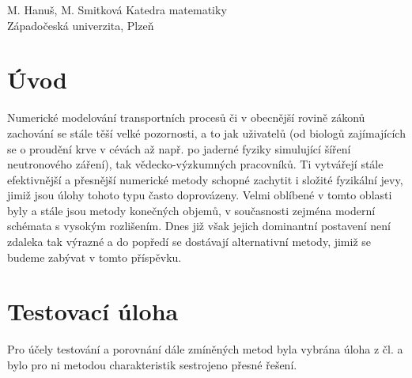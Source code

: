 \documentclass{sna}
\begin{document}
     {M. Hanuš, M. Smitková}
     {Katedra matematiky \\ Západočeská univerzita, Plzeň}

\section{Úvod}

Numerické modelování transportních procesů či v obecnější rovině zákonů zachování se stále těší velké pozornosti, a to jak uživatelů 
(od biologů zajímajících se o proudění krve v cévách až např. po jaderné fyziky simulující šíření neutronového záření), tak vědecko-výzkumných pracovníků. Ti vytvářejí stále efektivnější a přesnější numerické metody schopné zachytit i složité fyzikální jevy, jimiž jsou úlohy tohoto typu často doprovázeny. Velmi oblíbené v tomto oblasti byly a stále jsou metody konečných objemů, v současnosti zejména moderní schémata s vysokým rozlišením. Dnes již však jejich dominantní postavení není zdaleka tak výrazné a do popředí se dostávají alternativní metody, jimiž se budeme zabývat v tomto příspěvku.

\section{Testovací úloha}

Pro účely testování a porovnání dále zmíněných metod byla vybrána úloha z čl. \cite{Houston} a bylo pro ni metodou charakteristik sestrojeno přesné řešení.
\end{document}
